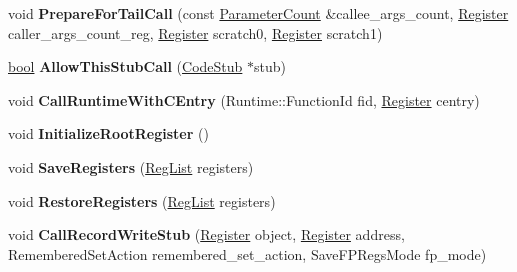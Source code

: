 \begin{DoxyCompactItemize}
\mbox{\label{classv8_1_1internal_1_1TurboAssembler_a39e544d96166c4b553cc204fae211b68}} 
void {\bfseries Prepare\+For\+Tail\+Call} (const \mbox{\hyperlink{classv8_1_1internal_1_1ParameterCount}{Parameter\+Count}} \&callee\+\_\+args\+\_\+count, \mbox{\hyperlink{classv8_1_1internal_1_1Register}{Register}} caller\+\_\+args\+\_\+count\+\_\+reg, \mbox{\hyperlink{classv8_1_1internal_1_1Register}{Register}} scratch0, \mbox{\hyperlink{classv8_1_1internal_1_1Register}{Register}} scratch1)
\item 
\mbox{\label{classv8_1_1internal_1_1TurboAssembler_a20348b464d89447388016d14eb6cb7e3}} 
\mbox{\hyperlink{classbool}{bool}} {\bfseries Allow\+This\+Stub\+Call} (\mbox{\hyperlink{classv8_1_1internal_1_1CodeStub}{Code\+Stub}} $\ast$stub)
\item 
\mbox{\label{classv8_1_1internal_1_1TurboAssembler_a402a6ba1a950da97bcbbf500be586951}} 
void {\bfseries Call\+Runtime\+With\+C\+Entry} (Runtime\+::\+Function\+Id fid, \mbox{\hyperlink{classv8_1_1internal_1_1Register}{Register}} centry)
\item 
\mbox{\label{classv8_1_1internal_1_1TurboAssembler_a919c742613dc1bcf65b76c2c8dddde57}} 
void {\bfseries Initialize\+Root\+Register} ()
\item 
\mbox{\label{classv8_1_1internal_1_1TurboAssembler_adb2676d473b8bdff1c6856758eabfa71}} 
void {\bfseries Save\+Registers} (\mbox{\hyperlink{classuint32__t}{Reg\+List}} registers)
\item 
\mbox{\label{classv8_1_1internal_1_1TurboAssembler_a1ff5e6044d8b7223b66061f3ed4123f1}} 
void {\bfseries Restore\+Registers} (\mbox{\hyperlink{classuint32__t}{Reg\+List}} registers)
\item 
\mbox{\label{classv8_1_1internal_1_1TurboAssembler_ab10280acd4d7aebd053a430cbea68fb1}} 
void {\bfseries Call\+Record\+Write\+Stub} (\mbox{\hyperlink{classv8_1_1internal_1_1Register}{Register}} object, \mbox{\hyperlink{classv8_1_1internal_1_1Register}{Register}} address, Remembered\+Set\+Action remembered\+\_\+set\+\_\+action, Save\+F\+P\+Regs\+Mode fp\+\_\+mode)

\end{DoxyCompactItemize}
